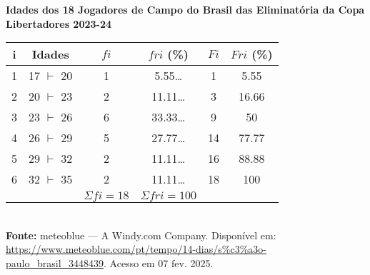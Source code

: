 \begin{center}
	\textbf{Idades dos 18 Jogadores de Campo do Brasil das Eliminatória da Copa Libertadores 2023-24}\\
	\begin{tabular}{c | c | c | c | c | c}
		\hline
		i & Idades         & $fi$              & $fri$ (\%)           & $Fi$ & $Fri$ (\%) \\
		\hline
		1 & 17 $\vdash$ 20 & 1                 & 5.55\dots            & 1    & 5.55       \\
		\hline
		2 & 20 $\vdash$ 23 & 2                 & 11.11\dots           & 3    & 16.66      \\
		\hline
		3 & 23 $\vdash$ 26 & 6                 & 33.33\dots           & 9    & 50         \\
		\hline
		4 & 26 $\vdash$ 29 & 5                 & 27.77\dots           & 14   & 77.77      \\
		\hline
		5 & 29 $\vdash$ 32 & 2                 & 11.11\dots           & 16   & 88.88      \\
		\hline
		6 & 32 $\vdash$ 35 & 2                 & 11.11\dots           & 18   & 100        \\
		\hline
		  &                & $\Sigma fi = 18 $ & $ \Sigma fri = 100 $ &      &
	\end{tabular}\\
	\textbf{Fonte:} meteoblue --- A Windy.com Company. Disponível em: \url{https://www.meteoblue.com/pt/tempo/14-dias/s\%c3\%a3o-paulo\_brasil\_3448439}. Acesso em 07 fev. 2025.
\end{center}
